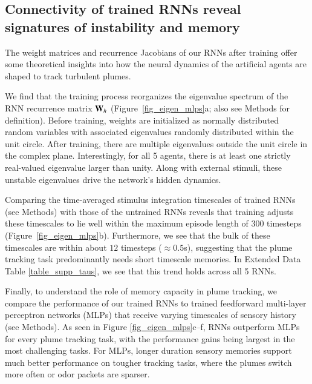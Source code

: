 \documentclass[5p,twocolumn,authoryear]{elsarticle}
\begin{document}
\subsection*{Connectivity of trained RNNs reveal signatures of instability and memory}
\label{sec_eigen}

The weight matrices and recurrence Jacobians of our RNNs after training offer some theoretical insights into how the neural dynamics of the artificial agents are shaped to track turbulent plumes.

We find that the training process reorganizes the eigenvalue spectrum of the RNN recurrence matrix $\mathbf{W}_h$ (Figure~\ref{fig_eigen_mlps}a; also see Methods for definition).
Before training, weights are initialized as normally distributed random variables with associated eigenvalues randomly distributed within the unit circle.
After training, there are multiple eigenvalues outside the unit circle in the complex plane.
Interestingly, for all 5 agents, there is at least one strictly real-valued eigenvalue larger than unity.
Along with external stimuli, these unstable eigenvalues drive the network's hidden dynamics.

Comparing the time-averaged stimulus integration timescales of trained RNNs (see Methods) with those of the untrained RNNs reveals that training adjusts these timescales to lie well within the maximum episode length of 300 timesteps (Figure~\ref{fig_eigen_mlps}b).
Furthermore, we see that the bulk of these timescales are within about $12$ timesteps ($\approx 0.5$s), suggesting that the plume tracking task predominantly needs short timescale memories.
In Extended Data Table \ref{table_supp_taus}, we see that this trend holds across all 5 RNNs. 



Finally, to understand the role of memory capacity in plume tracking, we compare the performance of our trained RNNs to trained feedforward multi-layer perceptron networks (MLPs) that receive varying timescales of sensory history (see Methods). 
As seen in Figure \ref{fig_eigen_mlps}c--f, RNNs outperform MLPs for every plume tracking task, with the performance gains being largest in the most challenging tasks.
For MLPs, longer duration sensory memories support much better performance on tougher tracking tasks, where the plumes switch more often or odor packets are sparser.
\end{document}
